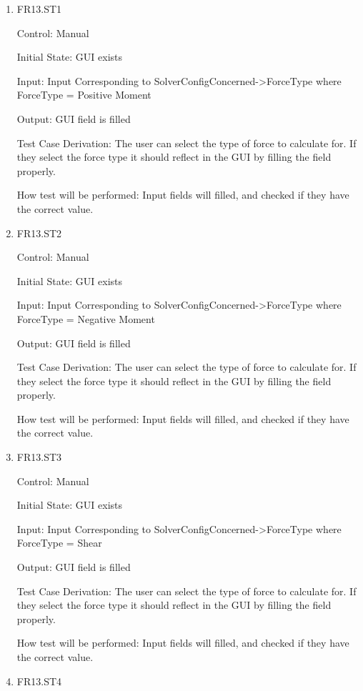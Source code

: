 \documentclass[12pt, titlepage]{article}
\begin{document}
\begin{enumerate}

\item{FR13.ST1\\}

Control: Manual
					
Initial State: GUI exists
					
Input: Input Corresponding to SolverConfigConcerned->ForceType where ForceType = Positive Moment 
					
Output: GUI field is filled

Test Case Derivation: The user can select the type of force to calculate for. If they select the force type it should reflect in the GUI by filling the field properly.

How test will be performed: Input fields will filled, and checked if they have the correct value.

\item{FR13.ST2\\}

Control: Manual
					
Initial State: GUI exists
					
Input: Input Corresponding to SolverConfigConcerned->ForceType where ForceType = Negative Moment 
					
Output: GUI field is filled

Test Case Derivation: The user can select the type of force to calculate for. If they select the force type it should reflect in the GUI by filling the field properly.

How test will be performed: Input fields will filled, and checked if they have the correct value.

\item{FR13.ST3\\}

Control: Manual
					
Initial State: GUI exists
					
Input: Input Corresponding to SolverConfigConcerned->ForceType where ForceType = Shear
					
Output: GUI field is filled

Test Case Derivation: The user can select the type of force to calculate for. If they select the force type it should reflect in the GUI by filling the field properly.

How test will be performed: Input fields will filled, and checked if they have the correct value.
					
\item{FR13.ST4\\}


\end{enumerate}
\end{document}
